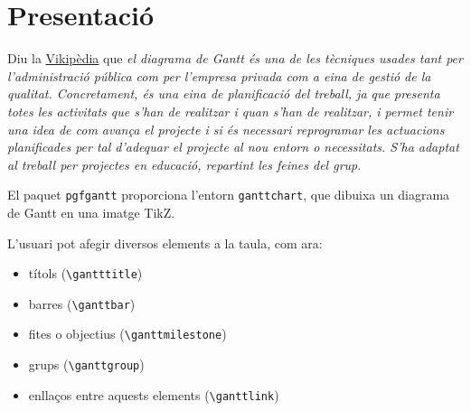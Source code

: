 \documentclass[a4paper,%
	      10pt,%
              DIV=14,%
              parskip=half,%
]{scrartcl}
\title{\Titol}
\author{Joan Queralt Gil\\cata\LaTeX{}}
\date{\today}
\begin{document}
\thispagestyle{empty}
\maketitle

\newpage

\pagestyle{scrheadings}
\section{Presentació}
Diu la \href{http://ca.wikipedia.org/wiki/Diagrama_de_Gantt}{Vikipèdia} que \textit{el diagrama de Gantt és una de les tècniques usades tant per l'administració pública com per l'empresa privada com a eina de gestió de la qualitat. Concretament, és una eina de planificació del treball, ja que presenta totes les activitats que s'han de realitzar i quan s'han de realitzar, i permet tenir una idea de com avança el projecte i si és necessari reprogramar les actuacions planificades per tal d'adequar el projecte al nou entorn o necessitats. S'ha adaptat al treball per projectes en educació, repartint les feines del grup}.

El paquet \verb+pgfgantt+ proporciona l'entorn \verb+ganttchart+, que
dibuixa un diagrama de Gantt en una imatge TikZ. 

L'usuari pot afegir diversos elements a la taula, com ara:
\begin{itemize}
 \item títols (\verb+\gantttitle+)
 \item barres (\verb+\ganttbar+)
 \item fites o objectius (\verb+\ganttmilestone+)
 \item grups (\verb+\ganttgroup+)
 \item enllaços entre aquests elements (\verb+\ganttlink+)
\end{itemize}
\end{document}
